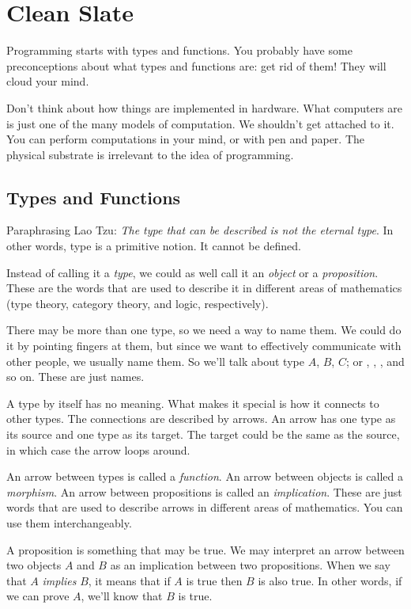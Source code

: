\documentclass[DaoFP]{subfiles}
\begin{document}
\chapter{Clean Slate}

Programming starts with types and functions. You probably have some preconceptions about what types and functions are: get rid of them! They will cloud your mind.

Don't think about how things are implemented in hardware. What computers are is just one of the many models of computation. We shouldn't get attached to it. You can perform computations in your mind, or with pen and paper. The physical substrate is irrelevant to the idea of programming.

\section{Types and Functions}

Paraphrasing Lao Tzu: \emph{The type that can be described is not the eternal type}. In other words, type is a primitive notion. It cannot be defined.

Instead of calling it a \emph{type}, we could as well call it an \emph{object} or a \emph{proposition}. These are the words that are used to describe it in different areas of mathematics (type theory, category theory, and logic, respectively).

There may be more than one type, so we need a way to name them. We could do it by pointing fingers at them, but since we want to effectively communicate with other people, we usually name them. So we'll talk about type $A$, $B$, $C$; or , , , and so on. These are just names.

A type by itself has no meaning. What makes it special is how it connects to other types. The connections are described by arrows. An arrow has one type as its source and one type as its target. The target could be the same as the source, in which case the arrow loops around.

An arrow between types is called a \emph{function}. An arrow between objects is called a \emph{morphism}. An arrow between propositions is called an \emph{implication}. These are just words that are used to describe arrows in different areas of mathematics. You can use them interchangeably.

A proposition is something that may be true. We may interpret an arrow between two objects $A$ and $B$ as an implication between two propositions. When we say that $A$ \emph{implies} $B$, it means that if $A$ is true then $B$ is also true. In other words, if we can prove $A$, we'll know that $B$ is true.
\pagebreak
\end{document}
